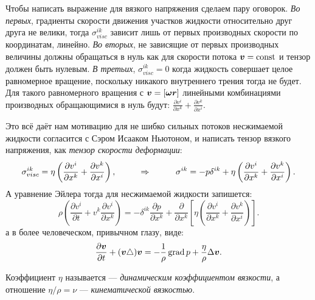 Чтобы написать выражение для вязкого напряжения сделаем пару оговорок. 
\textit{Во первых}, градиенты скорости движения участков жидкости относительно друг друга не велики, тогда $\sigma^{i k}_{visc}$ зависит лишь от первых производных скорости по координатам, линейно. \textit{Во вторых}, не зависящие от первых производных величины должны обращаться в нуль как для скорости потока $\mbox{\boldmath $v$} = \text{const}$ и тензор должен быть нулевым. \textit{В третьих}, $\sigma^{i k}_{visc} = 0$ когда жидкость совершает целое равномерное вращение, поскольку никакого внутреннего трения тогда не будет.
Для такого равномерного вращения с $\mbox{\boldmath $v$} = [\mbox{\boldmath $\omega$} \mbox{\boldmath $r$}]$ линейными комбинациями производных обращающимися в нуль будут: $\frac{\partial v^i}{\partial x^k} + \frac{\partial v^k}{\partial x^i}$.

Это всё даёт нам мотивацию для не шибко сильных потоков несжимаемой жидкости согласится с Сэром Исааком Ньютоном, и написать тензор вязкого напряжения, как \textit{тензор скорости деформации}:
\begin{equation*}
	\sigma^{i k}_{visc} = \eta \left(\frac{\partial v^i}{\partial x^k} + \frac{\partial v^k}{\partial x^i}\right),
	\hspace*{1 cm}
	\Rightarrow
	\hspace*{1 cm}
	\sigma^{i k} = - p \delta^{i k} + \eta \left(\frac{\partial v^i}{\partial x^k} + \frac{\partial v^k}{\partial x^i}\right).
\end{equation*}
А уравнение Эйлера тогда для несжимаемой жидкости запишется:
\begin{equation*}
	\rho \left(\frac{\partial v^i}{\partial t} + v^k \frac{\partial v^i}{\partial x^k}\right)
	=
	- \delta^{i k} \frac{\partial p}{\partial x^k} + \frac{\partial}{\partial x^k} \left[\eta \left(\frac{\partial v^i}{\partial x^k} + \frac{\partial v^k}{\partial x^i}\right)\right].
\end{equation*}
а в более человеческом, привычном глазу, виде:
\begin{equation*}
	\frac{\partial \mbox{\boldmath $v$}}{\partial t} + (\mbox{\boldmath $v$} \triangle) \mbox{\boldmath $v$} = - \frac{1}{\rho} \mathop{\mathrm{grad}}\nolimits p + \frac{\eta}{\rho} \Delta \mbox{\boldmath $v$}.
\end{equation*}
\begin{to_def}
	Коэффициент $\eta$ называется --- \textit{динамическим коэффициентом вязкости}, а отношение $\eta/\rho = \nu$ --- \textit{кинематической вязкостью}.
\end{to_def}
